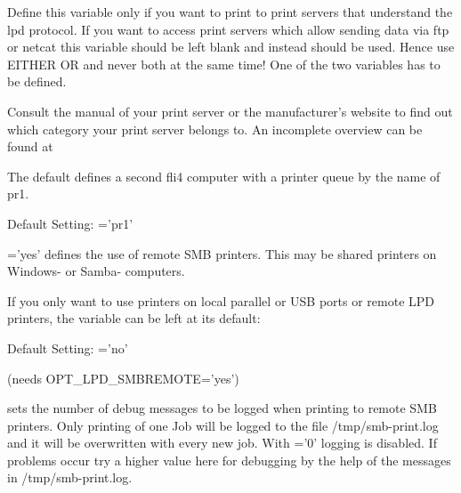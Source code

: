 \begin{description}
  Define this variable only if you want to print to print servers that
  understand the lpd protocol.
  If you want to access print servers which allow sending data via ftp or netcat
  this variable should be left blank and instead
   should be used.
  Hence use EITHER  OR
   and never both
  at the same time! One of the two variables has to be defined.

  Consult the manual of your print server or the manufacturer's website to find
  out which category your print server belongs to.
  An incomplete overview can be found at


  The default defines a second fli4 computer with a printer queue by the name
  of pr1.

  Default Setting: ='pr1'



  ='yes' defines the use of remote SMB printers.
  This may be shared printers on Windows- or Samba- computers.


  If you only want to use printers on local parallel or USB ports or remote
  LPD printers, the variable can be left at its default:

  Default Setting: ='no'


 (needs OPT\_LPD\_SMBREMOTE='yes')

   sets the number of debug messages to be
  logged when printing to remote SMB printers. Only printing of one Job will
  be logged to the file /tmp/smb-print.log and it will be overwritten with every
  new job. With ='0' logging is disabled.
  If problems occur try a higher value here for debugging by the help of the
  messages in /tmp/smb-print.log.


\end{description}
